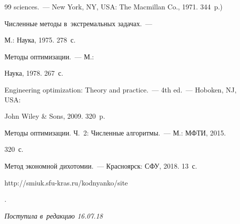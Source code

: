 {{\begin{thebibliography}{99}
sciences.~--- New York, NY, USA: The Macmillan Co., 1971. 344~p.)




 Численные методы в~экстремальных задачах.~--- 


М.: Наука, 1975. 278~с.




 Методы оптимизации.~--- М.: 


Наука, 1978. 267~с.







 Engineering optimization: Theory and practice.~--- 4th ed.~--- Hoboken, NJ, USA: 


John Wiley \& Sons, 2009. 320~p.




 Методы оптимизации. Ч.~2: Численные алгоритмы.~--- М.: МФТИ, 2015. 


320~с.




 Метод экономной дихотомии.~--- Красноярск: СФУ, 2018. 13~с. {\sf 


http://smiuk.sfu-kras.ru/kodnyanko/site}.


        \end{thebibliography}


} }








\vspace*{-3pt}





\hfill{\small\textit{Поступила в~редакцию 16.07.18}}
























